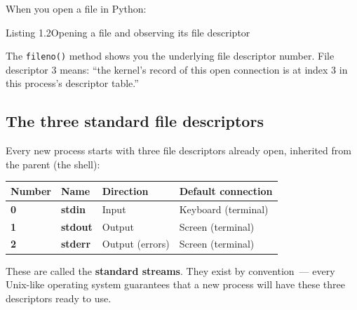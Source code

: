 When you open a file in Python:

\begin{codeboxcap}[short]{\textcolor{accent}{Listing 1.2}\enspace Opening a file and observing its file descriptor}

\begin{Shaded}
\begin{Highlighting}[]
\OperatorTok{=} \NormalTok{(}\NormalTok{, }\NormalTok{)}
\end{Highlighting}
\end{Shaded}

\end{codeboxcap}

\noindent{}The \texttt{fileno()} method shows you the underlying file descriptor number. File descriptor 3 means: ``the kernel's record of this open connection is at index 3 in this process's descriptor table.''

\subsection*{The three standard file descriptors}\label{01-command-to-process:the-three-standard-file-descriptors}

Every new process starts with three file descriptors already open, inherited from the parent (the shell):


{\def\LTcaptype{none} %
\begin{longtable}[]{@{}llll@{}}
\toprule\noalign{}
Number & Name & Direction & Default connection \\
\midrule\noalign{}
\endhead
\bottomrule\noalign{}
\endlastfoot
\textbf{0} & \textbf{stdin} & Input & Keyboard (terminal) \\
\textbf{1} & \textbf{stdout} & Output & Screen (terminal) \\
\textbf{2} & \textbf{stderr} & Output (errors) & Screen (terminal) \\
\end{longtable}
}

These are called the \textbf{standard streams}. They exist by convention~--- every Unix-like operating system guarantees that a new process will have these three descriptors ready to use.

